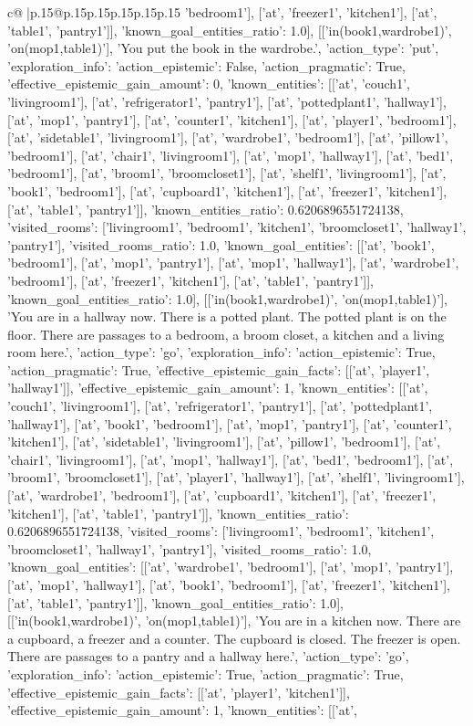 \documentclass{article}
\begin{document}
{\begin{supertabular}{c@{$\;$}|p{.15\linewidth}@{}p{.15\linewidth}p{.15\linewidth}p{.15\linewidth}p{.15\linewidth}p{.15\linewidth}}
{{{'bedroom1'], ['at', 'freezer1', 'kitchen1'], ['at', 'table1', 'pantry1']], 'known_goal_entities_ratio': 1.0}}], [['in(book1,wardrobe1)', 'on(mop1,table1)'], 'You put the book in the wardrobe.', {'action_type': 'put', 'exploration_info': {'action_epistemic': False, 'action_pragmatic': True, 'effective_epistemic_gain_amount': 0, 'known_entities': [['at', 'couch1', 'livingroom1'], ['at', 'refrigerator1', 'pantry1'], ['at', 'pottedplant1', 'hallway1'], ['at', 'mop1', 'pantry1'], ['at', 'counter1', 'kitchen1'], ['at', 'player1', 'bedroom1'], ['at', 'sidetable1', 'livingroom1'], ['at', 'wardrobe1', 'bedroom1'], ['at', 'pillow1', 'bedroom1'], ['at', 'chair1', 'livingroom1'], ['at', 'mop1', 'hallway1'], ['at', 'bed1', 'bedroom1'], ['at', 'broom1', 'broomcloset1'], ['at', 'shelf1', 'livingroom1'], ['at', 'book1', 'bedroom1'], ['at', 'cupboard1', 'kitchen1'], ['at', 'freezer1', 'kitchen1'], ['at', 'table1', 'pantry1']], 'known_entities_ratio': 0.6206896551724138, 'visited_rooms': ['livingroom1', 'bedroom1', 'kitchen1', 'broomcloset1', 'hallway1', 'pantry1'], 'visited_rooms_ratio': 1.0, 'known_goal_entities': [['at', 'book1', 'bedroom1'], ['at', 'mop1', 'pantry1'], ['at', 'mop1', 'hallway1'], ['at', 'wardrobe1', 'bedroom1'], ['at', 'freezer1', 'kitchen1'], ['at', 'table1', 'pantry1']], 'known_goal_entities_ratio': 1.0}}], [['in(book1,wardrobe1)', 'on(mop1,table1)'], 'You are in a hallway now. There is a potted plant. The potted plant is on the floor. There are passages to a bedroom, a broom closet, a kitchen and a living room here.', {'action_type': 'go', 'exploration_info': {'action_epistemic': True, 'action_pragmatic': True, 'effective_epistemic_gain_facts': [['at', 'player1', 'hallway1']], 'effective_epistemic_gain_amount': 1, 'known_entities': [['at', 'couch1', 'livingroom1'], ['at', 'refrigerator1', 'pantry1'], ['at', 'pottedplant1', 'hallway1'], ['at', 'book1', 'bedroom1'], ['at', 'mop1', 'pantry1'], ['at', 'counter1', 'kitchen1'], ['at', 'sidetable1', 'livingroom1'], ['at', 'pillow1', 'bedroom1'], ['at', 'chair1', 'livingroom1'], ['at', 'mop1', 'hallway1'], ['at', 'bed1', 'bedroom1'], ['at', 'broom1', 'broomcloset1'], ['at', 'player1', 'hallway1'], ['at', 'shelf1', 'livingroom1'], ['at', 'wardrobe1', 'bedroom1'], ['at', 'cupboard1', 'kitchen1'], ['at', 'freezer1', 'kitchen1'], ['at', 'table1', 'pantry1']], 'known_entities_ratio': 0.6206896551724138, 'visited_rooms': ['livingroom1', 'bedroom1', 'kitchen1', 'broomcloset1', 'hallway1', 'pantry1'], 'visited_rooms_ratio': 1.0, 'known_goal_entities': [['at', 'wardrobe1', 'bedroom1'], ['at', 'mop1', 'pantry1'], ['at', 'mop1', 'hallway1'], ['at', 'book1', 'bedroom1'], ['at', 'freezer1', 'kitchen1'], ['at', 'table1', 'pantry1']], 'known_goal_entities_ratio': 1.0}}], [['in(book1,wardrobe1)', 'on(mop1,table1)'], 'You are in a kitchen now. There are a cupboard, a freezer and a counter. The cupboard is closed. The freezer is open. There are passages to a pantry and a hallway here.', {'action_type': 'go', 'exploration_info': {'action_epistemic': True, 'action_pragmatic': True, 'effective_epistemic_gain_facts': [['at', 'player1', 'kitchen1']], 'effective_epistemic_gain_amount': 1, 'known_entities': [['at', }}}
\end{supertabular}}
\end{document}

